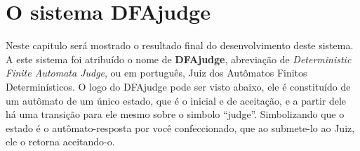 \documentclass[
	12pt,				%
	openany,
	oneside,
	a4paper,			%
	english,			%
	brazil				%
	]{abntex2}
\begin{document}

\chapter[O sistema DFAjudge] {O sistema DFAjudge}

  Neste capitulo será mostrado o resultado final do desenvolvimento deste sistema. A este sistema foi atribuído o nome de \textbf{DFAjudge}, abreviação de \textit{Deterministic Finite Automata Judge}, ou em português, Juiz dos Autômatos Finitos Determinísticos. O logo do DFAjudge pode ser visto abaixo, ele é constituído de um autômato de um único estado, que é o inicial e de aceitação, e a partir dele há uma transição para ele mesmo sobre o simbolo ``judge''. Simbolizando que o estado é o autômato-resposta por você confeccionado, que ao submete-lo ao Juiz, ele o retorna aceitando-o. %
  
\end{document}
